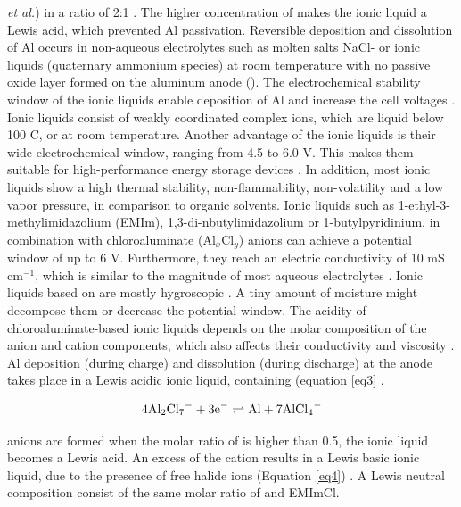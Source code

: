 \textit{et al.}) in a ratio of 2:1 \cite{gifford_aluminum/chlorine_1988-1}. The higher concentration of  makes the ionic liquid a Lewis acid, which prevented Al passivation. 
Reversible deposition and dissolution of Al occurs in non-aqueous electrolytes such as molten salts NaCl- or ionic liquids (quaternary ammonium species) at room temperature with no passive oxide layer formed on the aluminum anode (\cite{vestergaard}\cite{galinski}\cite{elia_insights}). The electrochemical stability window of the ionic liquids enable deposition of Al and increase the cell voltages \cite{li_aluminum_2002}. Ionic liquids consist of weakly coordinated complex ions, which are liquid below 100 C, or at room temperature. Another advantage of the ionic liquids is their wide electrochemical window, ranging from 4.5 to 6.0 V. This makes them suitable for high-performance energy storage devices \cite{wang_binder-free_2015}. In addition, most ionic liquids show a high thermal stability, non-flammability, non-volatility and a low vapor pressure, in comparison to organic solvents. Ionic liquids such as 1-ethyl-3-methylimidazolium (EMIm), 1,3-di-nbutylimidazolium or 1-butylpyridinium, in combination with chloroaluminate (Al$_x$Cl$_y$) anions can achieve a potential window of up to 6 V. Furthermore, they reach an electric conductivity of 10 mS cm$^{−1}$, which is similar to the magnitude of most aqueous electrolytes \cite{ngo_thermal}. Ionic liquids based on   are mostly hygroscopic \cite{ueda_electro}. A tiny amount of moisture might decompose them or decrease the potential window. The acidity of chloroaluminate-based ionic liquids depends on the molar composition of the anion and cation components, which also affects their conductivity and viscosity \cite{buzzeo}. 
Al deposition (during charge) and dissolution (during discharge) at the anode takes place in a Lewis acidic ionic liquid, containing  (equation \ref{eq3} \cite{galinski}.

\begin{align} \label{eq3}
   4\ce{Al2Cl7^{-}} + 3\ce{e-} \rightleftharpoons \ce{Al} + 7\ce{AlCl4^{-}}  
\end{align}

 anions are formed when the molar ratio of  is higher than 0.5, the ionic liquid becomes a Lewis acid. An excess of the cation results in a Lewis basic ionic liquid, due to the presence of free halide ions (Equation \ref{eq4}) \cite{holbrey}. A Lewis neutral composition consist of the same molar ratio of  and EMImCl. 

